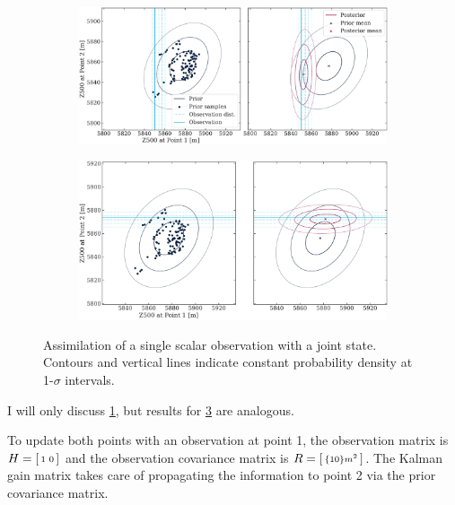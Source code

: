 \documentclass[parskip=half,DIV=16]{scrartcl}
\begin{document}
\begin{figure}[H]
   \centering
   
   \begin{subfigure}[c]{0.8\textwidth}
      \includegraphics[width=\textwidth]{figures/vector_1.pdf}
      \label{fig:vector-1}
   \end{subfigure}
   
   \bigskip
   
   \begin{subfigure}[c]{0.8\textwidth}
      \includegraphics[width=\textwidth]{figures/vector_2.pdf}
      \label{fig:vector-2}
   \end{subfigure}

   \caption{Assimilation of a single scalar observation with a joint state. Contours and vertical lines indicate constant probability density at 1-$\sigma$ intervals.}
\end{figure}



I will only discuss \cref{fig:vector-1}, but results for \cref{fig:vector-2} are analogous.

To update both points with an observation at point 1, the observation matrix is $H = \smqty[1 & 0]$ and the observation covariance matrix is $R = \smqty[\qty{10}{m^2}]$. The Kalman gain matrix takes care of propagating the information to point 2 via the prior covariance matrix.
\end{document}
